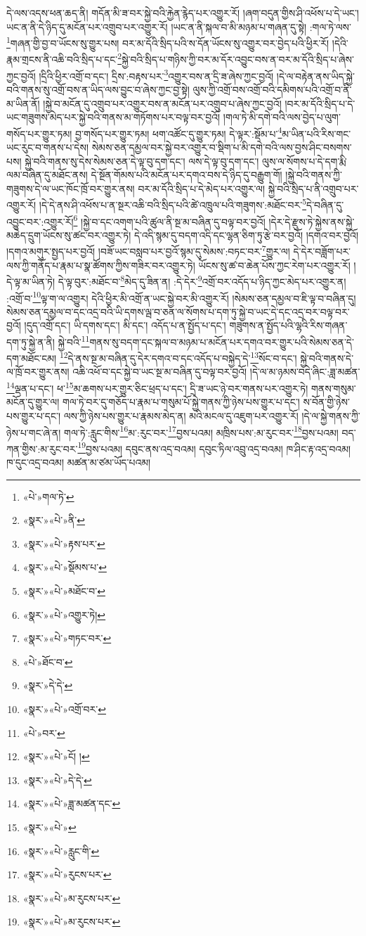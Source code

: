 དེ་ལས་འདས་ཕན་ཆད་ནི། གདོན་མི་ཟ་བར་སྐྱེ་བའི་རྐྱེན་རྙེད་པར་འགྱུར་རོ། །ཞག་བདུན་གྱིས་ཤི་འཕོས་པ་དེ་ཡང་། ཡང་ན་ནི་དེ་ཉིད་དུ་མངོན་པར་འགྲུབ་པར་འགྱུར་རོ། །ཡང་ན་ནི་སྐལ་བ་མི་མཉམ་པ་གཞན་དུ་སྟེ། :གལ་ཏེ་ལས་\footnote{«པེ་»གལ་ཏེ་}གཞན་གྱི་བྱ་བ་ཡོངས་སུ་གྱུར་པས། བར་མ་དོའི་སྲིད་པའི་ས་དོན་ཡོངས་སུ་འགྱུར་བར་བྱེད་པའི་ཕྱིར་རོ། །དེའི་རྣམ་གྲངས་ནི་འཆི་བའི་སྲིད་པ་དང་\footnote{«སྣར་»«པེ་»ནི་}སྐྱེ་བའི་སྲིད་པ་གཉིས་ཀྱི་བར་མ་དོར་འབྱུང་བས་ན་བར་མ་དོའི་སྲིད་པ་ཞེས་ཀྱང་བྱའོ། །དྲིའི་ཕྱིར་འགྲོ་བ་དང་། དྲིས་:བརྟས་པར་\footnote{«སྣར་»«པེ་»རྟས་པར་}འགྱུར་བས་ན་དྲི་ཟ་ཞེས་ཀྱང་བྱའོ། །དེ་ལ་བརྟེན་ནས་ཡིད་སྐྱེ་བའི་གནས་སུ་འགྲོ་བས་ན་ཡིད་ལས་བྱུང་བ་ཞེས་ཀྱང་བྱ་སྟེ། ལུས་ཀྱི་འགྲོ་བས་འགྲོ་བའི་དམིགས་པའི་འགྲོ་བ་ནི་མ་ཡིན་ནོ། །སྐྱེ་བ་མངོན་དུ་འགྲུབ་པར་འགྱུར་བས་ན་མངོན་པར་འགྲུབ་པ་ཞེས་ཀྱང་བྱའོ། །བར་མ་དོའི་སྲིད་པ་དེ་ཡང་གཟུགས་མེད་པར་སྐྱེ་བའི་གནས་མ་གཏོགས་པར་བལྟ་བར་བྱའོ། །གལ་ཏེ་མི་དགེ་བའི་ལས་བྱེད་པ་ལུག་གསོད་པར་གྱུར་ཏམ། བྱ་གསོད་པར་གྱུར་ཏམ། ཕག་འཚོང་དུ་གྱུར་ཏམ། དེ་ལྟར་:སྡོམ་པ་\footnote{«སྣར་»«པེ་»སྡོམས་པ་}མ་ཡིན་པའི་རིས་གང་ཡང་རུང་བ་གནས་པ་དེས། སེམས་ཅན་དམྱལ་བར་སྐྱེ་བར་འགྱུར་བ་སྡིག་པ་མི་དགེ་བའི་ལས་བྱས་ཤིང་བསགས་པས། སྐྱེ་བའི་གནས་སུ་དེས་སེམས་ཅན་དེ་ལྟ་བུ་དག་དང་། ལས་དེ་ལྟ་བུ་དག་དང་། ལུས་ལ་སོགས་པ་དེ་དག་རྨི་ལམ་བཞིན་དུ་མཐོང་ནས། དེ་སྔོན་གོམས་པའི་མངོན་པར་དགའ་བས་དེ་ཉིད་དུ་བརྒྱུག་གོ། །སྐྱེ་བའི་གནས་ཀྱི་གཟུགས་དེ་ལ་ཡང་ཁོང་ཁྲོ་བར་གྱུར་ནས། བར་མ་དོའི་སྲིད་པ་དེ་མེད་པར་འགྱུར་ལ། སྐྱེ་བའི་སྲིད་པ་ནི་འགྲུབ་པར་འགྱུར་རོ། །དེ་དེ་ནས་ཤི་འཕོས་པ་ན་སྔར་འཆི་བའི་སྲིད་པའི་ཚེ་འཁྲུལ་པའི་གཟུགས་:མཐོང་བར་\footnote{«སྣར་»«པེ་»མཐོང་བ་}དེ་བཞིན་དུ་འབྱུང་བར་:འགྱུར་རོ།\footnote{«སྣར་»«པེ་»འགྱུར་ཏེ།} །སྐྱེ་བ་དང་འགག་པའི་ཚུལ་ནི་སྔ་མ་བཞིན་དུ་བལྟ་བར་བྱའོ། །དེར་དེ་རྫུས་ཏེ་སྐྱེས་ནས་སྐྱེ་མཆེད་དྲུག་ཡོངས་སུ་ཚང་བར་འགྱུར་ཏེ། དེ་འདི་སྙམ་དུ་བདག་འདི་དང་ལྷན་ཅིག་ཏུ་རྩེ་བར་བྱའོ། །དགའ་བར་བྱའོ། །དགའ་མགུར་སྤྱད་པར་བྱའོ། །བཟོ་ཡང་བསླབ་པར་བྱའོ་སྙམ་དུ་སེམས་:བཏང་བར་\footnote{«སྣར་»«པེ་»གཏང་བར་}གྱུར་ལ། དེ་དེར་བཟློག་པར་ལས་ཀྱི་གནོད་པ་རྣམ་པ་སྣ་ཚོགས་ཀྱིས་གཟིར་བར་འགྱུར་ཏེ། ཡོངས་སུ་ཚ་བ་ཆེན་པོས་ཀྱང་རེག་པར་འགྱུར་རོ། །དེ་ལྟ་མ་ཡིན་ཏེ། དེ་ལྟ་བུར་:མཐོང་བ་\footnote{«པེ་»ཐོང་བ་}མེད་དུ་ཟིན་ན། :དེ་དེར་\footnote{«སྣར་»དེ་དེ་}འགྲོ་བར་འདོད་པ་ཉིད་ཀྱང་མེད་པར་འགྱུར་ན། :འགྲོ་བ་\footnote{«སྣར་»«པེ་»འགྲོ་བར་}ལྟ་ག་ལ་འགྱུར། དེའི་ཕྱིར་མི་འགྲོ་ན་ཡང་སྐྱེ་བར་མི་འགྱུར་རོ། །སེམས་ཅན་དམྱལ་བ་ཇི་ལྟ་བ་བཞིན་དུ། སེམས་ཅན་དམྱལ་བ་དང་འདྲ་བའི་ཡི་དགས་ལྦ་བ་ཅན་ལ་སོགས་པ་དག་ཏུ་སྐྱེ་བ་ཡང་དེ་དང་འདྲ་བར་བལྟ་བར་བྱའོ། །དུད་འགྲོ་དང་། ཡི་དགས་དང་། མི་དང་། འདོད་པ་ན་སྤྱོད་པ་དང་། གཟུགས་ན་སྤྱོད་པའི་ལྷའི་རིས་གཞན་དག་ཏུ་སྐྱེ་ན་ནི། སྐྱེ་བའི་\footnote{«པེ་»བར་}གནས་སུ་བདག་དང་སྐལ་བ་མཉམ་པ་མངོན་པར་དགའ་བར་གྱུར་པའི་སེམས་ཅན་དེ་དག་མཐོང་ངམ། \footnote{«སྣར་»«པེ་»ངོ། ། }དེ་ནས་སྔ་མ་བཞིན་དུ་དེར་དགའ་བ་དང་འདོད་པ་བསྐྱེད་དེ་\footnote{«སྣར་»«པེ་»དེ་དེ་}སོང་བ་དང་། སྐྱེ་བའི་གནས་དེ་ལ་ཁྲོ་བར་གྱུར་ནས། འཆི་འཕོ་བ་དང་སྐྱེ་བ་ཡང་སྔ་མ་བཞིན་དུ་བལྟ་བར་བྱའོ། །དེ་ལ་མ་ཉམས་བདེ་ཞིང་:ཟླ་མཚན་\footnote{«སྣར་»«པེ་»ཟླ་མཚན་དང་}ལྡན་པ་དང་། ཕ་\footnote{«སྣར་»«པེ་»}མ་ཆགས་པར་གྱུར་ཅིང་ཕྲད་པ་དང་། དྲི་ཟ་ཡང་ཉེ་བར་གནས་པར་འགྱུར་ཏེ། གནས་གསུམ་མངོན་དུ་གྱུར་ལ། གལ་ཏེ་བར་དུ་གཅོད་པ་རྣམ་པ་གསུམ་པོ་སྐྱེ་གནས་ཀྱི་ཉེས་པས་གྱུར་པ་དང་། ས་བོན་གྱི་ཉེས་པས་གྱུར་པ་དང་། ལས་ཀྱི་ཉེས་པས་གྱུར་པ་རྣམས་མེད་ན། མའི་མངལ་དུ་འཇུག་པར་འགྱུར་རོ། །དེ་ལ་སྐྱེ་གནས་ཀྱི་ཉེས་པ་གང་ཞེ་ན། གལ་ཏེ་:རླུང་གིས་\footnote{«སྣར་»«པེ་»རླུང་གི་}མ་:རུང་བར་\footnote{«སྣར་»«པེ་»རུངས་པར་}བྱས་པའམ། མཁྲིས་པས་:མ་རུང་བར་\footnote{«སྣར་»«པེ་»མ་རུངས་པར་}བྱས་པའམ། བད་ཀན་གྱིས་:མ་རུང་བར་\footnote{«སྣར་»«པེ་»མ་རུངས་པར་}བྱས་པའམ། དབུང་ནས་འདྲ་བའམ། དབུང་ཏིལ་འབྲུ་འདྲ་བའམ། ཁ་ཤིང་རྟ་འདྲ་བའམ། ཁ་དུང་འདྲ་བའམ། མཚན་མ་ཙམ་ཡོད་པའམ། 